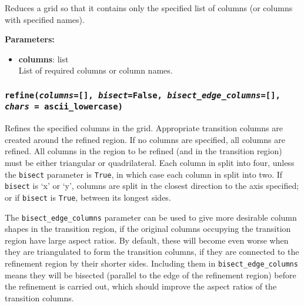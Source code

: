 Reduces a grid so that it contains only the specified list of columns (or columns with specified names).

\textbf{Parameters:}
\begin{itemize}
  \item \textbf{columns}: list\\
    List of required columns or column names.
\end{itemize}

\begin{snugshade}\subsubsection{\texttt{refine(\emph{columns}=[], \emph{bisect}=False, \emph{bisect\_edge\_columns}=[],\\
    \emph{chars} = ascii\_lowercase)}}\end{snugshade}
\label{sec:mulgrid:refine}

Refines the specified columns in the grid.  Appropriate transition columns are created around the refined region.  If no columns are specified, all columns are refined.  All columns in the region to be refined (and in the transition region) must be either triangular or quadrilateral.  Each column in split into four, unless the \texttt{bisect} parameter is \texttt{True}, in which case each column in split into two.  If \texttt{bisect} is `x' or `y', columns are split in the closest direction to the axis specified; or if \texttt{bisect} is \texttt{True}, between its longest sides.

The \texttt{bisect\_edge\_columns} parameter can be used to give more desirable column shapes in the transition region, if the original columns occupying the transition region have large aspect ratios.  By default, these will become even worse when they are triangulated to form the transition columns, if they are connected to the refinement region by their shorter sides.  Including them in \texttt{bisect\_edge\_columns} means they will be bisected (parallel to the edge of the refinement region) before the refinement is carried out, which should improve the aspect ratios of the transition columns.

